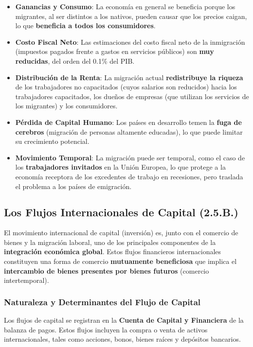 \begin{itemize}
    \item \textbf{Ganancias y Consumo}: La economía en general se beneficia porque los migrantes, al ser distintos a los nativos, pueden causar que los precios caigan, lo que \textbf{beneficia a todos los consumidores}.
    \item \textbf{Costo Fiscal Neto}: Las estimaciones del costo fiscal neto de la inmigración (impuestos pagados frente a gastos en servicios públicos) son \textbf{muy reducidas}, del orden del 0.1\% del PIB.
    \item \textbf{Distribución de la Renta}: La migración actual \textbf{redistribuye la riqueza} de los trabajadores no capacitados (cuyos salarios son reducidos) hacia los trabajadores capacitados, los dueños de empresas (que utilizan los servicios de los migrantes) y los consumidores.
    \item \textbf{Pérdida de Capital Humano}: Los países en desarrollo temen la \textbf{fuga de cerebros} (migración de personas altamente educadas), lo que puede limitar su crecimiento potencial.
    \item \textbf{Movimiento Temporal}: La migración puede ser temporal, como el caso de los \textbf{trabajadores invitados} en la Unión Europea, lo que protege a la economía receptora de los excedentes de trabajo en recesiones, pero traslada el problema a los países de emigración.
\end{itemize}


\subsection{Los Flujos Internacionales de Capital (2.5.B.)}

El movimiento internacional de capital (inversión) es, junto con el comercio de bienes y la migración laboral, uno de los principales componentes de la \textbf{integración económica global}. Estos flujos financieros internacionales constituyen una forma de comercio \textbf{mutuamente beneficiosa} que implica el \textbf{intercambio de bienes presentes por bienes futuros} (comercio intertemporal).

\subsubsection{Naturaleza y Determinantes del Flujo de Capital}
Los flujos de capital se registran en la \textbf{Cuenta de Capital y Financiera} de la balanza de pagos. Estos flujos incluyen la compra o venta de activos internacionales, tales como acciones, bonos, bienes raíces y depósitos bancarios.

